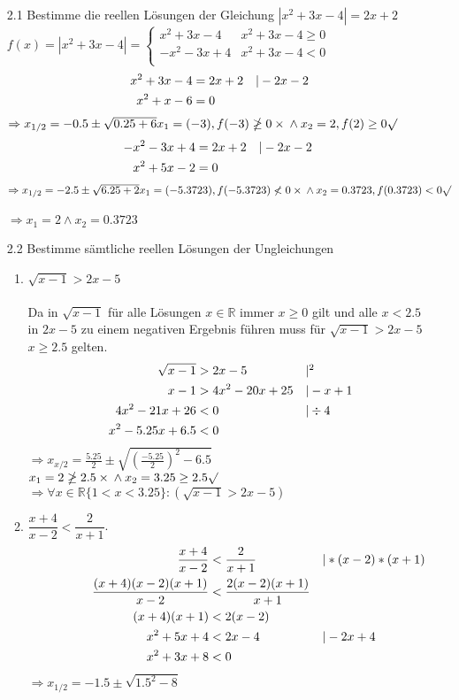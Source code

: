 \documentclass[12pt,letterpaper]{article}
\newcommand{\alignleft}[1]{\tag*{\llap{\makebox[\linewidth][l]{$#1$}}}}
\newcommand{\LLeftrightarrow}{ \alignleft{\Leftrightarrow}}
\newcommand{\eqinfo}[1]{&\makebox[2cm][l]{$\vert #1$}}
\newcommand{\Eqn}[3]{#1 &#2 #3}
\newcommand{\eqn}[2]{\LLeftrightarrow\Eqn{#1}{=}{#2}\\}
\newcommand{\eqnfi}[3]{\Eqn{#1}{=}{#2}\eqinfo{#3}\\}
\newcommand{\geqn}[3]{\LLeftrightarrow\Eqn{#1}{#2}{#3}\\}
\newcommand{\geqni}[4]{\LLeftrightarrow\Eqn{#1}{#2}{#3}\eqinfo{#4}\\}
\newcommand{\geqnfi}[4]{\Eqn{#1}{#2}{#3}\eqinfo{#4}\\}
\begin{document}
\begin{enumerate}
\item [2.1] Bestimme die reellen Lösungen der Gleichung $|x^2+3x-4|=2x+2$\\
$f(x)=|x^2+3x-4| = \begin{cases}
x^2+3x-4 &x^2+3x-4\geq 0\\
-x^2-3x+4 &x^2+3x-4<0\\
\end{cases}$\\
\begin{align*}
\eqnfi{x^2+3x-4}{2x+2}{-2x-2}
\eqn{x^2+x-6}{0}
\end{align*}
$\Rightarrow x_{1/2} = -0.5\pm\sqrt{0.25+6}\\
x_1=(-3), f(-3)\ngeq 0 \times\\ \land x_2=2, f(2)\geq 0 \surd$
\begin{align*}
\eqnfi{-x^2-3x+4}{2x+2}{-2x-2}
\eqn{x^2+5x-2}{0}
\end{align*}
$\Rightarrow x_{1/2} = -2.5\pm\sqrt{6.25+2}\\
x_1=(-5.3723), f(-5.3723)\nless 0 \times\\ \land x_2=0.3723, f(0.3723)< 0 \surd$\\\\
$\Rightarrow x_1=2 \land x_2=0.3723$
\item [2.2] Bestimme sämtliche reellen Lösungen der Ungleichungen\\
\begin{enumerate}
\item $\sqrt{x-1}>2x-5$\\\\
Da in $\sqrt{x-1}$ für alle Lösungen $x\in\mathbb{R}$ immer $x\geq 0$ gilt und alle $x<2.5$ in $2x-5$ zu einem negativen Ergebnis führen muss für $\sqrt{x-1}>2x-5$ $x\geq2.5$ gelten.
\begin{align*}
\geqnfi{\sqrt{x-1}}{>}{2x-5}{^2}
\geqni{x-1}{>}{4x^2-20x+25}{-x+1}
\geqni{4x^2-21x+26}{<}{0}{\div 4}
\geqn{x^2-5.25x+6.5}{<}{0}
\end{align*}
$\Rightarrow x_{x/2}= \frac{5.25}{2}\pm\sqrt{(\frac{-5.25}{2})^2-6.5}$\\
$x_1=2\ngeq 2.5 \times\\ \land x_2=3.25\geq 2.5 \surd$\\
$\Rightarrow \forall x\in\mathbb{R}\{1<x<3.25\}:(\sqrt{x-1}>2x-5)$\\
\item $\dfrac{x+4}{x-2}<\dfrac{2}{x+1}$.\\
\begin{align*}
\geqnfi{\frac{x+4}{x-2}}{<}{\frac{2}{x+1}}{*(x-2)*(x+1)}
\geqn{\frac{(x+4)(x-2)(x+1)}{x-2}}{<}{\frac{2(x-2)(x+1)}{x+1}}
\geqn{(x+4)(x+1)}{<}{2(x-2)}
\geqni{x^2+5x+4}{<}{2x-4}{-2x+4}
\geqn{x^2+3x+8}{<}{0}
\end{align*}
$\Rightarrow x_{1/2} = -1.5\pm\sqrt{1.5^2-8}$
\end{enumerate}
\end{enumerate}
\end{document}

